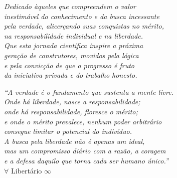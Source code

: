 \documentclass[
	12pt,				%
    oneside,            %
	a4paper,			%
	english,			%
	brazilian,		    %
	]{AcademicoUFT}
\begin{document}
\begin{dedicatoria}
   \vspace*{\fill}
   \centering
   \textit{Dedicado àqueles que compreendem o valor\\ 
        inestimável do conhecimento e da busca incessante\\ 
        pela verdade, alicerçando suas conquistas no mérito,\\ 
        na responsabilidade individual e na liberdade.\\
        Que esta jornada científica inspire a próxima\\ 
        geração de construtores, movidos pela lógica\\ 
        e pela convicção de que o progresso é fruto\\
        da iniciativa privada e do trabalho honesto.}
    \vspace*{\fill}
\end{dedicatoria}



\begin{agradecimentos}
\lipsum[1] %

\end{agradecimentos}



\begin{epigrafe}
    \vspace*{\fill}
    \begin{flushright}
        \textit{``A verdade é o fundamento que sustenta a mente livre.\\
        Onde há liberdade, nasce a responsabilidade;\\
        onde há responsabilidade, floresce o mérito;\\
        e onde o mérito prevalece, nenhum poder arbitrário\\
        consegue limitar o potencial do indivíduo.\\
        A busca pela liberdade não é apenas um ideal,\\
        mas um compromisso diário com a razão, a coragem\\
        e a defesa daquilo que torna cada ser humano único.''}\\[1em]
        $\forall$ Libertário \(\infty\) 
    \end{flushright}
\end{epigrafe}
\end{document}
